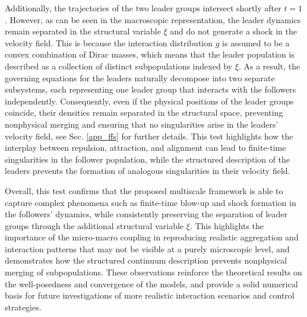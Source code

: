 \documentclass[10pt, reqno]{amsart}
\theoremstyle{definition}
\theoremstyle{remark}
\numberwithin{equation}{section}
\begin{document}
Additionally, the trajectories of the two leader groups intersect shortly after $t = 1$. However, as can be seen in the macroscopic representation, the leader dynamics remain separated in the structural variable $\xi$ and do not generate a shock in the velocity field. This is because the interaction distribution $g$ is assumed to be a convex combination of Dirac masses, which means that the leader population is described as a collection of distinct subpopulations indexed by $\xi$. As a result, the governing equations for the leaders naturally decompose into two separate subsystems, each representing one leader group that interacts with the followers independently.
Consequently, even if the physical positions of the leader groups coincide, their densities remain separated in the structural space, preventing nonphysical merging and ensuring that no singularities arise in the leaders’ velocity field, see Sec. \ref{app_ffs} for further details. This test highlights how the interplay between repulsion, attraction, and alignment can lead to finite-time singularities in the follower population, while the structured description of the leaders prevents the formation of analogous singularities in their velocity field.

Overall, this test confirms that the proposed multiscale framework is able to capture complex phenomena such as finite-time blow-up and shock formation in the followers' dynamics, while consistently preserving the separation of leader groups through the additional structural variable $\xi$.  
This highlights the importance of the micro-macro coupling in reproducing realistic aggregation and interaction patterns that may not be visible at a purely microscopic level, and demonstrates how the structured continuum description prevents nonphysical merging of subpopulations.  These observations reinforce the theoretical results on the well-posedness and convergence of the models, and provide a solid numerical basis for future investigations of more realistic interaction scenarios and control strategies.
\end{document}
